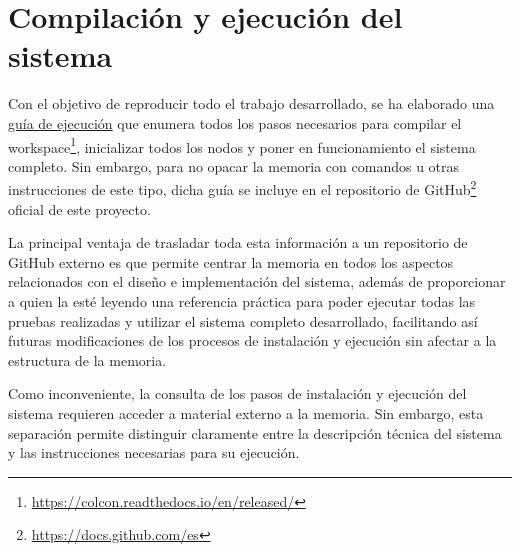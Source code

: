 \section{Compilación y ejecución del sistema}
\label{sec:segundaseccion}

Con el objetivo de reproducir todo el trabajo desarrollado, se ha elaborado una \href{https://github.com/aleon2020/cable_driven_parallel_robot_2d/blob/main/README.md}{guía de ejecución} que enumera todos los pasos necesarios para compilar el workspace\footnote{\url{https://colcon.readthedocs.io/en/released/}}, inicializar todos los nodos y poner en funcionamiento el sistema completo. Sin embargo, para no opacar la memoria con comandos u otras instrucciones de este tipo, dicha guía se incluye en el repositorio de GitHub\footnote{\url{https://docs.github.com/es}} oficial de este proyecto.

\vspace{0.25cm}

La principal ventaja de trasladar toda esta información a un repositorio de GitHub \cite{microros_espidf,microxrce_dds} externo es que permite centrar la memoria en todos los aspectos relacionados con el diseño e implementación del sistema, además de proporcionar a quien la esté leyendo una referencia práctica para poder ejecutar todas las pruebas realizadas y utilizar el sistema completo desarrollado, facilitando así futuras modificaciones de los procesos de instalación y ejecución sin afectar a la estructura de la memoria.

\vspace{0.25cm}

Como inconveniente, la consulta de los pasos de instalación y ejecución del sistema requieren acceder a material externo a la memoria. Sin embargo, esta separación permite distinguir claramente entre la descripción técnica del sistema y las instrucciones necesarias para su ejecución.
